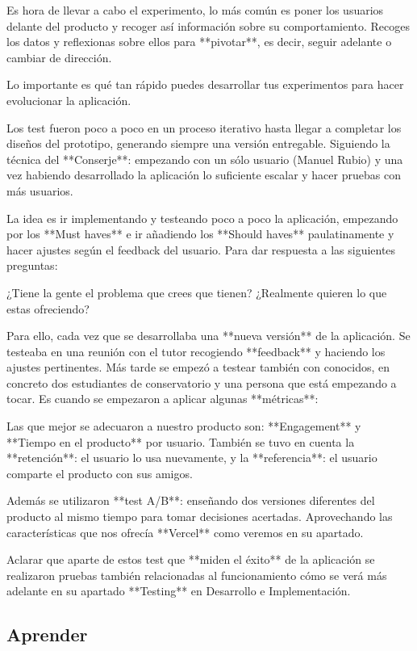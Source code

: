 \documentclass[12pt,twoside,titlepage]{report}
\begin{document}
{Es hora de llevar a cabo el experimento, lo más común es poner los usuarios delante del producto y recoger así información sobre su comportamiento. Recoges los datos y reflexionas sobre ellos para **pivotar**, es decir, seguir adelante o cambiar de dirección. 

Lo importante es qué tan rápido puedes desarrollar tus experimentos para hacer evolucionar la aplicación. 

Los test fueron poco a poco en un proceso iterativo hasta llegar a completar los diseños del prototipo, generando siempre una versión entregable. Siguiendo la técnica del **Conserje**: empezando con un sólo usuario (Manuel Rubio) y una vez habiendo desarrollado la aplicación lo suficiente escalar y hacer pruebas con más usuarios.

La idea es ir implementando y testeando poco a poco la aplicación, empezando por los **Must haves** e ir añadiendo los **Should haves** paulatinamente y hacer ajustes según el feedback del usuario. Para dar respuesta a las siguientes preguntas:

¿Tiene la gente el problema que crees que tienen? ¿Realmente quieren lo que estas ofreciendo?

Para ello, cada vez que se desarrollaba una **nueva versión** de la aplicación. Se testeaba en una reunión con el tutor recogiendo **feedback** y haciendo los ajustes pertinentes. Más tarde se empezó a testear también con conocidos, en concreto dos estudiantes de conservatorio y una persona que está empezando a tocar. Es cuando se empezaron a aplicar algunas **métricas**:

Las que mejor se adecuaron a nuestro producto son: **Engagement** y **Tiempo en el producto** por usuario. También se tuvo en cuenta la **retención**: el usuario lo usa nuevamente, y la **referencia**: el usuario comparte el producto con sus amigos.

Además se utilizaron **test A/B**: enseñando dos versiones diferentes del producto al mismo tiempo para tomar decisiones acertadas. Aprovechando las características que nos ofrecía **Vercel** como veremos en su apartado.

Aclarar que aparte de estos test que **miden el éxito** de la aplicación se realizaron pruebas también relacionadas al funcionamiento cómo se verá más adelante en su apartado **Testing** en Desarrollo e Implementación.

\subsection{Aprender}

}
\end{document}
